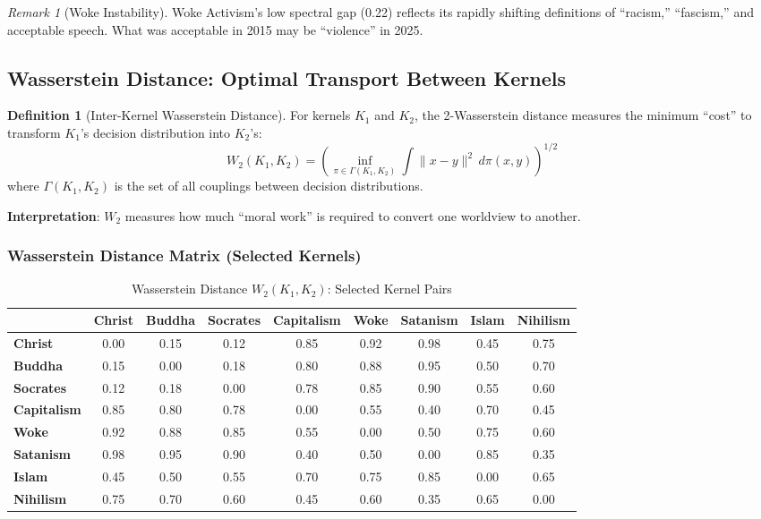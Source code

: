 \documentclass[11pt,a4paper]{article}
\theoremstyle{definition}
\newtheorem{definition}[theorem]{Definition}
\theoremstyle{remark}
\newtheorem{remark}{Remark}
\begin{document}
\begin{remark}[Woke Instability]
Woke Activism's low spectral gap (0.22) reflects its rapidly shifting definitions of ``racism,'' ``fascism,'' and acceptable speech. What was acceptable in 2015 may be ``violence'' in 2025.
\end{remark}

\subsection{Wasserstein Distance: Optimal Transport Between Kernels}

\begin{definition}[Inter-Kernel Wasserstein Distance]
\label{def:wasserstein}
For kernels $K_1$ and $K_2$, the 2-Wasserstein distance measures the minimum ``cost'' to transform $K_1$'s decision distribution into $K_2$'s:
\begin{equation}
    W_2(K_1, K_2) = \left( \inf_{\pi \in \Gamma(K_1, K_2)} \int \|x - y\|^2 \, d\pi(x, y) \right)^{1/2}
    \label{eq:wasserstein}
\end{equation}
where $\Gamma(K_1, K_2)$ is the set of all couplings between decision distributions.
\end{definition}

\textbf{Interpretation}: $W_2$ measures how much ``moral work'' is required to convert one worldview to another.

\subsubsection{Wasserstein Distance Matrix (Selected Kernels)}

\begin{table}[H]
\centering
\caption{Wasserstein Distance $W_2(K_1, K_2)$: Selected Kernel Pairs}
\label{tab:wasserstein-matrix}
\scriptsize
\begin{tabular}{@{}l|cccccccc@{}}
\toprule
& \textbf{Christ} & \textbf{Buddha} & \textbf{Socrates} & \textbf{Capitalism} & \textbf{Woke} & \textbf{Satanism} & \textbf{Islam} & \textbf{Nihilism} \\
\midrule
\textbf{Christ} & 0.00 & 0.15 & 0.12 & 0.85 & 0.92 & 0.98 & 0.45 & 0.75 \\
\textbf{Buddha} & 0.15 & 0.00 & 0.18 & 0.80 & 0.88 & 0.95 & 0.50 & 0.70 \\
\textbf{Socrates} & 0.12 & 0.18 & 0.00 & 0.78 & 0.85 & 0.90 & 0.55 & 0.60 \\
\textbf{Capitalism} & 0.85 & 0.80 & 0.78 & 0.00 & 0.55 & 0.40 & 0.70 & 0.45 \\
\textbf{Woke} & 0.92 & 0.88 & 0.85 & 0.55 & 0.00 & 0.50 & 0.75 & 0.60 \\
\textbf{Satanism} & 0.98 & 0.95 & 0.90 & 0.40 & 0.50 & 0.00 & 0.85 & 0.35 \\
\textbf{Islam} & 0.45 & 0.50 & 0.55 & 0.70 & 0.75 & 0.85 & 0.00 & 0.65 \\
\textbf{Nihilism} & 0.75 & 0.70 & 0.60 & 0.45 & 0.60 & 0.35 & 0.65 & 0.00 \\
\bottomrule
\end{tabular}
\end{table}
\end{document}
